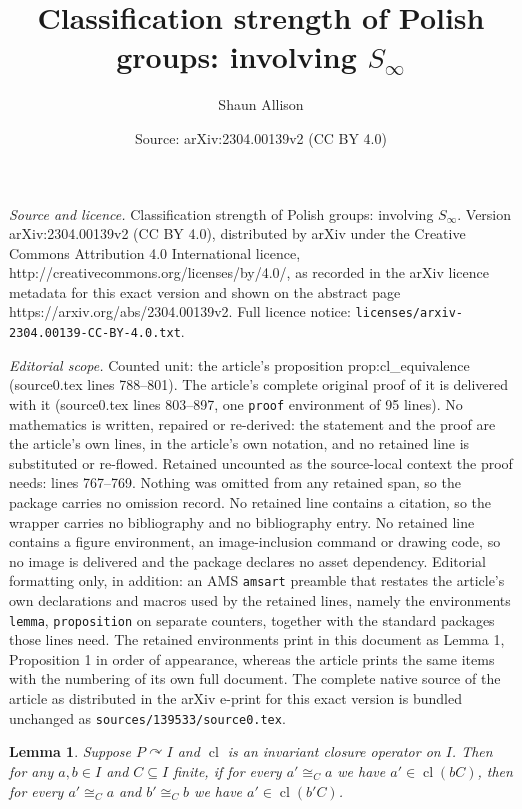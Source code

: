 \documentclass[10pt,a4paper]{amsart}
\title{Classification strength of Polish groups: involving $S_\infty$}
\author{Shaun Allison}
\date{Source: arXiv:2304.00139v2 (CC BY 4.0)}
\newtheorem{lemma}{Lemma}
\DeclareMathOperator{\cl}{cl}
\newcommand{\isom}{\cong}
\begin{document}
\maketitle

\noindent\emph{Source and licence.} Classification strength of Polish groups: involving $S_\infty$. Version arXiv:2304.00139v2 (CC BY 4.0), distributed by arXiv under the Creative Commons Attribution 4.0 International licence, http://creativecommons.org/licenses/by/4.0/, as recorded in the arXiv licence metadata for this exact version and shown on the abstract page https://arxiv.org/abs/2304.00139v2. Full licence notice: \texttt{licenses/arxiv-2304.00139-CC-BY-4.0.txt}.\par\smallskip

\noindent\textit{Editorial scope.} Counted unit: the article's proposition prop:cl\_equivalence (source0.tex lines 788--801). The article's complete original proof of it is delivered with it (source0.tex lines 803--897, one \texttt{proof} environment of 95 lines). No mathematics is written, repaired or re-derived: the statement and the proof are the article's own lines, in the article's own notation, and no retained line is substituted or re-flowed.  Retained uncounted as the source-local context the proof needs: lines 767--769.  Nothing was omitted from any retained span, so the package carries no omission record.  No retained line contains a citation, so the wrapper carries no bibliography and no bibliography entry.  No retained line contains a figure environment, an image-inclusion command or drawing code, so no image is delivered and the package declares no asset dependency.  Editorial formatting only, in addition: an AMS \texttt{amsart} preamble that restates the article's own declarations and macros used by the retained lines, namely the environments \texttt{lemma}, \texttt{proposition} on separate counters, together with the standard packages those lines need.  The retained environments print in this document as Lemma 1, Proposition 1 in order of appearance, whereas the article prints the same items with the numbering of its own full document.  The complete native source of the article as distributed in the arXiv e-print for this exact version is bundled unchanged as \texttt{sources/139533/source0.tex}.
\begin{lemma}\label{lem:one_side}
Suppose $P \curvearrowright I$ and $\cl$ is an invariant closure operator on $I$. Then for any $a, b \in I$ and $C \subseteq I$ finite, if for every $a' \isom_{C} a$ we have $a' \in \cl(bC)$, then for every $a' \isom_{C} a$ and $b' \isom_{C} b$ we have $a' \in \cl(b' C)$.
\end{lemma}
\end{document}
